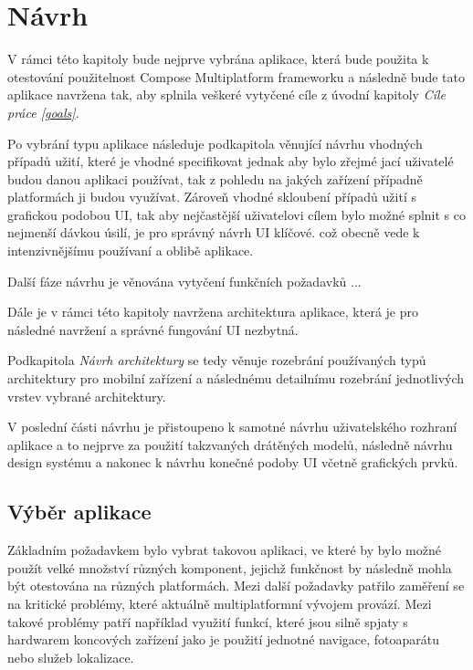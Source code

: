 \chapter{Návrh}
V rámci této kapitoly bude nejprve vybrána aplikace, která bude použita k otestování použitelnost Compose Multiplatform frameworku a následně
bude tato aplikace navržena tak, aby splnila veškeré vytyčené cíle z úvodní kapitoly \textit{Cíle práce \ref{goals}}.

Po vybrání typu aplikace následuje podkapitola věnující návrhu vhodných případů užití, které je vhodné specifikovat jednak aby bylo zřejmé jací 
uživatelé budou danou aplikaci používat, tak z pohledu na jakých zařízení případně platformách ji budou využívat. 
Zároveň vhodné skloubení případů užití s grafickou podobou UI, tak aby nejčastější uživatelovi cílem bylo možné splnit s co nejmenší dávkou úsilí, 
je pro správný návrh UI klíčové. 
což obecně vede k intenzivnějšímu používaní a oblibě aplikace.


Další fáze návrhu je věnována vytyčení funkčních požadavků ...

Dále je v rámci této kapitoly navržena architektura aplikace, která je pro následné navržení a správné fungování UI nezbytná. 

Podkapitola \textit{Návrh architektury} se tedy věnuje rozebrání používaných typů architektury pro mobilní zařízení a následnému detailnímu
rozebrání jednotlivých vrstev vybrané architektury.

V poslední části návrhu je přistoupeno k samotné návrhu uživatelského rozhraní aplikace a to nejprve za použití takzvaných drátěných modelů,
následně návrhu design systému a nakonec k návrhu konečné podoby UI včetně grafických prvků.



\section{Výběr aplikace}
Základním požadavkem bylo vybrat takovou aplikaci, ve které by bylo možné použít velké množství různých komponent, jejichž funkčnost by následně mohla být otestována
na různých platformách.
Mezi další požadavky patřilo zaměření se na kritické problémy, které aktuálně multiplatformní vývojem provází. 
Mezi takové problémy patří například využití funkcí, které jsou silně spjaty s hardwarem koncových zařízení jako je použití jednotné navigace, fotoaparátu 
nebo služeb lokalizace.

